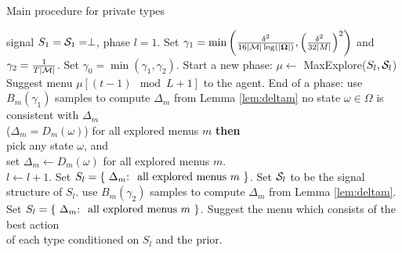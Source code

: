 \begin{algorithm}[t]
    \caption{Main procedure for private types }
    	\label{alg:nocc_main}
    \begin{algorithmic}[1]
    	 signal $S_1 = \S_1= \perp$, phase $l=1$.
        \STATE {}
    	\STATE Set $\gamma_1 =\min\left(\frac{\delta^2}{16|\M|\log(|\varOmega|)},\left( \frac{\delta^2}{32|M|}\right)^2\right)$ and $\gamma_2 =  \frac{1}{T|\M|}$.
    \STATE Set $\gamma_0=\min(\gamma_1,\gamma_2)$.
		\STATE {}
			\STATE Start a new phase:
            \STATE $\mu \leftarrow $ MaxExplore($S_l, \S_l$)
                \TAB{}
		\ENDIF
		\STATE Suggest menu $\mu [ (t-1) \mod L + 1]$ to the agent.
			\STATE End of a phase:
            \STATE use $B_m(\gamma_1)$ samples to compute $\Delta_m$ from Lemma \ref{lem:deltam}
            \ENDFOR
			 no state $\omega\in \varOmega$ is consistent with $\Delta_m$ \\
            (\ie $\Delta_m = D_m(\omega)$) for all explored menus $m$ {\bf then} \\
            \STATE \TAB pick any state $\omega$, and \\
            \STATE \TAB set $\Delta_m \leftarrow D_m(\omega)$ for all explored menus $m$. \\
			\STATE $l \leftarrow l + 1$.
			\STATE Set $S_l = \{ \text{ $\Delta_m$:\; all explored menus $m$ } \}$.
            \STATE Set $\S_l$ to be the signal structure of $S_l$.
		\ENDIF
	\ELSE
		\STATE {}
            \STATE use $B_m(\gamma_2)$ samples to compute $\Delta_m$ from Lemma \ref{lem:deltam}.
        \ENDFOR
        \STATE Set $S_l = \{ \text{ $\Delta_m$:\; all explored menus $m$ } \}$.
        \ENDIF
		\STATE Suggest the menu which consists of the best action \\
        \STATE \TAB of each type conditioned on $S_l$ and the prior.
	\ENDIF
	\ENDFOR
     \end{algorithmic}
\end{algorithm}

